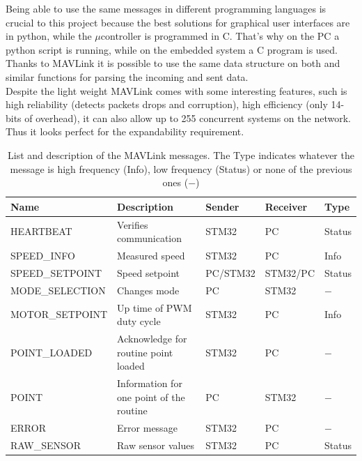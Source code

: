 \documentclass[12pt,a4paper, twoside]{article}
\begin{document}
Being able to use the same messages in different programming languages is crucial to this project because the best solutions for graphical user interfaces are in python, while the $\mu$controller is programmed in C. That's why on the PC a python script is running, while on the embedded system a C program is used. Thanks to MAVLink it is possible to use the same data structure on both and similar functions for parsing the incoming and sent data.\\

Despite the light weight MAVLink comes with some interesting features, such is high reliability (detects packets drops and corruption), high efficiency (only 14-bits of overhead), it can also allow up to 255 concurrent systems on the network. Thus it looks perfect for the expandability requirement.

\begin{table}[H]
	\centering
	\begin{tabular}{l||p{3cm}|l|l|l} 
		\textbf{Name} &\textbf{Description} &\textbf{Sender} &\textbf{Receiver} & \textbf{Type}\\ 
		\hline
		\hline 
		HEARTBEAT &Verifies communication& STM32 & PC & Status \\ 
		\hline 
		SPEED\_INFO &Measured speed  & STM32 & PC & Info \\ 
		\hline 
		SPEED\_SETPOINT & Speed setpoint & PC/STM32 & STM32/PC & Status\\ 
		\hline 
		MODE\_SELECTION & Changes mode & PC & STM32 & $-$\\ 
		\hline 
		MOTOR\_SETPOINT & Up time of PWM duty cycle & STM32 & PC & Info  \\ 
		\hline 
		POINT\_LOADED & Acknowledge for routine point loaded  & STM32 & PC & $-$ \\ 
		\hline 
		POINT & Information for one point of the routine  & PC & STM32 & $-$  \\  
		\hline 
		ERROR & Error message & STM32 & PC & $-$  \\
		\hline
		RAW\_SENSOR & Raw sensor values & STM32 & PC & Status\\
	\end{tabular} 
	\caption[MAVLink messages description]{List and description of the MAVLink messages. The Type indicates whatever the message is high frequency (Info), low frequency (Status) or none of the previous ones ($-$)}
	\label{tab:msg}
\end{table}
\end{document}
